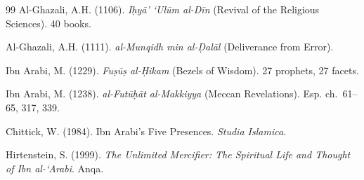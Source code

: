 \documentclass[11pt]{article}
\begin{document}
\begin{thebibliography}{99}
Al-Ghazali, A.H. (1106). \emph{I\d{h}y\=a' `Ul\=um al-D\=in} (Revival of the Religious Sciences). 40 books.

Al-Ghazali, A.H. (1111). \emph{al-Munqidh min al-\d{D}al\=al} (Deliverance from Error).

Ibn Arabi, M. (1229). \emph{Fu\d{s}\=u\d{s} al-\d{H}ikam} (Bezels of Wisdom). 27 prophets, 27 facets.

Ibn Arabi, M. (1238). \emph{al-Fut\=u\d{h}\=at al-Makkiyya} (Meccan Revelations). Esp. ch.~61--65, 317, 339.

Chittick, W. (1984). Ibn Arabi's Five Presences. \emph{Studia Islamica}.

Hirtenstein, S. (1999). \emph{The Unlimited Mercifier: The Spiritual Life and Thought of Ibn al-`Arabi}. Anqa.

\end{thebibliography}
\end{document}
